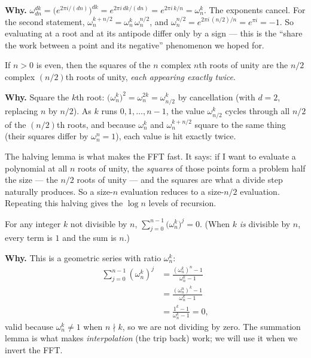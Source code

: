 \begin{formalbox}
\textbf{Why.} $\omega_{dn}^{dk} = \big(e^{2\pi i/(dn)}\big)^{dk}
= e^{2\pi i \, dk/(dn)} = e^{2\pi i\, k/n} = \omega_n^k.$ The exponents cancel.
For the second statement, $\omega_n^{k+n/2} = \omega_n^k\,\omega_n^{n/2}$, and
$\omega_n^{n/2} = e^{2\pi i \,(n/2)/n} = e^{\pi i} = -1$. So evaluating at a root and
at its antipode differ only by a sign --- this is the ``share the work between a
point and its negative'' phenomenon we hoped for.
\end{formalbox}

\begin{lemma}[Halving]\label{ch29:halving}
If $n>0$ is even, then the squares of the $n$ complex $n$th roots of unity are the
$n/2$ complex $(n/2)$th roots of unity, \emph{each appearing exactly twice}.
\end{lemma}

\begin{formalbox}
\textbf{Why.} Square the $k$th root: $\big(\omega_n^k\big)^2 = \omega_n^{2k}
= \omega_{n/2}^{k}$ by cancellation (with $d=2$, replacing $n$ by $n/2$). As $k$
runs $0,1,\dots,n-1$, the value $\omega_{n/2}^{k}$ cycles through all $n/2$ of the
$(n/2)$th roots, and because $\omega_n^k$ and $\omega_n^{k+n/2}$ square to the same
thing (their squares differ by $\omega_n^{n} = 1$), each value is hit exactly twice.
\end{formalbox}

\begin{intuitionbox}
The halving lemma is what makes the FFT fast. It says: if I want to
evaluate a polynomial at all $n$ roots of unity, the \emph{squares} of those points
form a problem half the size --- the $n/2$ roots of unity --- and the squares are
what a divide step naturally produces. So a size-$n$ evaluation reduces to a
size-$n/2$ evaluation. Repeating this halving gives the $\log n$ levels of recursion.
\end{intuitionbox}

\begin{lemma}[Summation]\label{ch29:summation}
For any integer $k$ not divisible by $n$,
$\displaystyle \sum_{j=0}^{n-1}\big(\omega_n^{k}\big)^{j} = 0.$
(When $k$ \emph{is} divisible by $n$, every term is $1$ and the sum is $n$.)
\end{lemma}

\begin{formalbox}
\textbf{Why.} This is a geometric series with ratio $\omega_n^k$:
\begin{align*}
\sum_{j=0}^{n-1}(\omega_n^k)^j
&= \frac{(\omega_n^k)^n - 1}{\omega_n^k - 1} \\
&= \frac{(\omega_n^n)^k - 1}{\omega_n^k - 1} \\
&= \frac{1^k - 1}{\omega_n^k - 1} = 0,
\end{align*}
valid because $\omega_n^k \ne 1$ when $n\nmid k$, so we are not dividing by zero.
The
summation lemma is what makes \emph{interpolation} (the trip back) work; we will use
it when we invert the FFT.
\end{formalbox}

